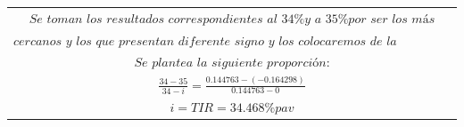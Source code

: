 \begin{center}
\begin{longtable}{|c|c|c|}
        \multicolumn{3}{|c|}{$ \textit{Se toman los resultados correspondientes al 34\%  y a 35\% por ser los más}$}                                                                                                                  \\
        \multicolumn{3}{|c|}{$  \textit{cercanos y los que presentan diferente signo y los colocaremos de la siguiente forma:}$}                                                                                                      \\
        \multicolumn{3}{|c|}{$ \textit{Se plantea la siguiente proporción:} $}                                                                                                                                                        \\
        \multicolumn{3}{|c|}{$ \frac{34-35}{34-i} = \frac{0.144763-(-0.164298)}{0.144763-0}$ }                                                                                                                                        \\
        \multicolumn{3}{|c|}{$ i = TIR = 34.468\% pav$}                                                                                                                                                                               \\
        \hline


\end{longtable}
\end{center}
